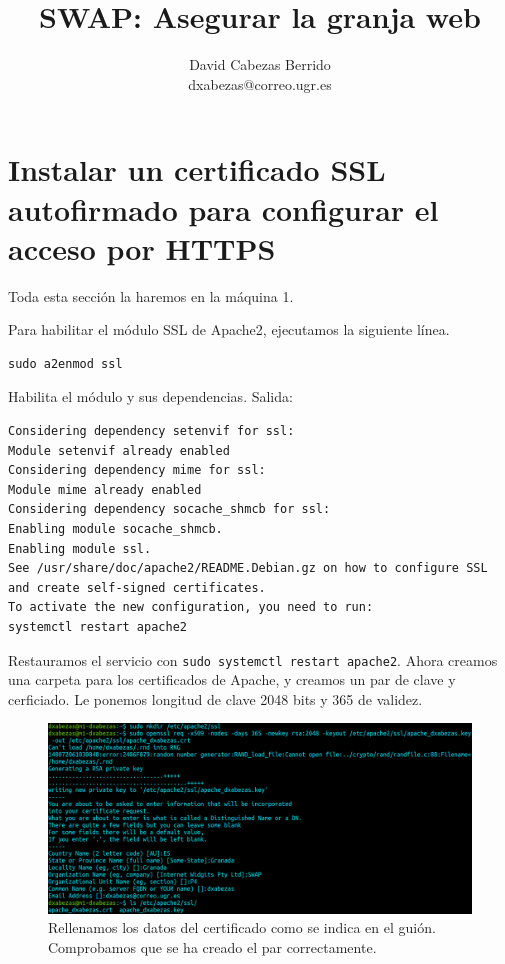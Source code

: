 \documentclass{article}
\title{\Huge SWAP: Asegurar la granja web\vspace{10mm}}
\author{\huge David Cabezas Berrido \vspace{10mm} \\ 
  \huge dxabezas@correo.ugr.es \vspace{10mm}}
\begin{document}
\maketitle
\tableofcontents
\newpage

\section{Instalar un certificado SSL autofirmado para configurar el acceso por HTTPS}

Toda esta sección la haremos en la máquina 1.

Para habilitar el módulo SSL de Apache2, ejecutamos la siguiente línea.

\begin{Verbatim}[tabsize=4]
sudo a2enmod ssl 
\end{Verbatim}
Habilita el módulo y sus dependencias. Salida:
\begin{Verbatim}[tabsize=4]
Considering dependency setenvif for ssl:
Module setenvif already enabled
Considering dependency mime for ssl:
Module mime already enabled
Considering dependency socache_shmcb for ssl:
Enabling module socache_shmcb.
Enabling module ssl.
See /usr/share/doc/apache2/README.Debian.gz on how to configure SSL and create self-signed certificates.
To activate the new configuration, you need to run:
systemctl restart apache2
\end{Verbatim}
Restauramos el servicio con \verb^sudo systemctl restart apache2^. Ahora creamos una carpeta para los certificados de Apache, y creamos un par de clave y cerficiado. Le ponemos longitud de clave 2048 bits y 365 de validez.

\begin{figure}[H]
	\centering
	\includegraphics[width=180mm]{imgs/cert-create}
	\caption{Rellenamos los datos del certificado como se indica en el guión. Comprobamos que se ha creado el par correctamente.}
	\label{fig:cert-create}
\end{figure}
\end{document}
